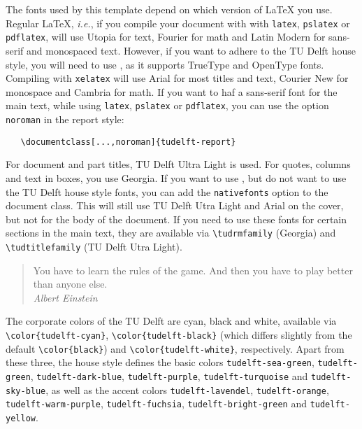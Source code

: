 The fonts used by this template depend on which version of \LaTeX{} you use. Regular \LaTeX, \emph{i.e.}, if you compile your document with with \texttt{latex}, \texttt{pslatex} or \texttt{pdflatex}, will use Utopia for text, Fourier for math and Latin Modern for sans-serif and monospaced text. 
However, if you want to adhere to the TU Delft house style, you will need to use \XeLaTeX, as it supports TrueType and OpenType fonts. Compiling with \texttt{xelatex} will use Arial for most titles and text, Courier New for monospace and Cambria for math. If you want to haf a sans-serif font for the
main text, while using \texttt{latex}, \texttt{pslatex} or \texttt{pdflatex}, you can use the option \texttt{noroman} in the report style: 
\begin{verbatim}
   \documentclass[...,noroman]{tudelft-report}
\end{verbatim}
For document and part titles,  TU Delft Ultra Light is used. For quotes, columns and text in boxes, you use Georgia. If you want to use \XeLaTeX, but do not want to use the TU Delft house style fonts, you can add the \texttt{nativefonts} option to the document class. This will still use  TU Delft Utra Light and Arial on the cover, but not for the body of the document. If you need to use these fonts for certain sections in the main text, they are available via \verb|\tudrmfamily| (Georgia) and \verb|\tudtitlefamily| (TU Delft Utra Light).

\begin{quote}
  You have to learn the rules of the game. And then you have to play better than anyone else.\\
  \emph{Albert Einstein}
\end{quote}

The corporate colors of the TU Delft are cyan, black and white, available via 
{\color{tudelft-cyan}\verb|\color{tudelft-cyan}|}, 
{\color{tudelft-black}\verb|\color{tudelft-black}|} 
(which differs slightly from the default 
{\color{black}\verb|\color{black}|}) 
and \verb|\color{tudelft-white}|, respectively. 
Apart from these three, the house style defines the basic colors \texttt{\color{tudelft-sea-green}tudelft-sea-green}, \texttt{\color{tudelft-green}tudelft-green}, \texttt{\color{tudelft-dark-blue}tudelft-dark-blue}, \texttt{\color{tudelft-purple}tudelft-purple}, \texttt{\color{tudelft-turquoise}tudelft-turquoise} and \texttt{\color{tudelft-sky-blue}tudelft-sky-blue}, as well as the accent colors \texttt{\color{tudelft-lavendel}tudelft-lavendel}, \texttt{\color{tudelft-orange}tudelft-orange}, \texttt{\color{tudelft-warm-purple}tudelft-warm-purple}, \texttt{\color{tudelft-fuchsia}tudelft-fuchsia}, \texttt{\color{tudelft-bright-green}tudelft-bright-green} and \texttt{\color{tudelft-yellow}tudelft-yellow}.

